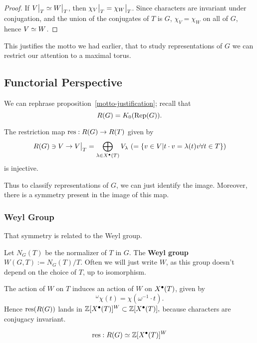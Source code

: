 \begin{proof}
If $\restr{V}{T} \iso \restr{W}{T}$, then
$\restr{\chi_V}{T} = \restr{\chi_W}{T}$. Since characters are invariant under
conjugation, and the union of the conjugates of $T$ is $G$, $\chi_V = \chi_W$ on
all of $G$, hence $V \simeq W$.
\end{proof}

This justifies the motto we had earlier, that to study representations of $G$ 
we can restrict our attention to a maximal torus.

\subsection{Functorial Perspective}

We can rephrase proposition~\ref{motto-justification}; recall that
\[ R(G) = K_0(\mathrm{Rep}(G)). \]

\begin{prop}
The restriction map $\operatorname{res}: R(G) \rightarrow R(T)$ given by 
\[ R(G) \ni V \rightarrow \restr{V}{T}
    = \bigoplus_{\lambda \in \cgroup T} V_\lambda
    \ (= \{ v \in V | t \cdot v = \lambda(t) v \forall t \in T \}) \]
is injective.
\end{prop}

Thus to classify representations of $G$, we can just identify the image.
Moreover, there is a symmetry present in the image of this map.

\subsubsection{Weyl Group} That symmetry is related to the Weyl group.

\begin{defn}
Let $N_G(T)$ be the normalizer of $T$ in $G$. The \textbf{Weyl group}
$W(G, T) := N_G(T)/T$. Often we will just write $W$, as this group doesn't
depend on the choice of $T$, up to isomorphism.
\end{defn}

The action of $W$ on $T$ induces an action of $W$ on $X^\bullet(T)$, given by
\[ ^\omega \chi(t) = \chi(\omega^{-1} \cdot t). \] Hence $\operatorname{res}(R(G))$ lands
in $\mathbb{Z}[X^\bullet(T)]^W \subset \mathbb{Z}[X^\bullet(T)],$ because characters are
conjugacy invariant.

\begin{theorem}
\[ \operatorname{res}: R(G) \simeq \mathbb{Z}[X^\bullet(T)]^W \]
\end{theorem}

